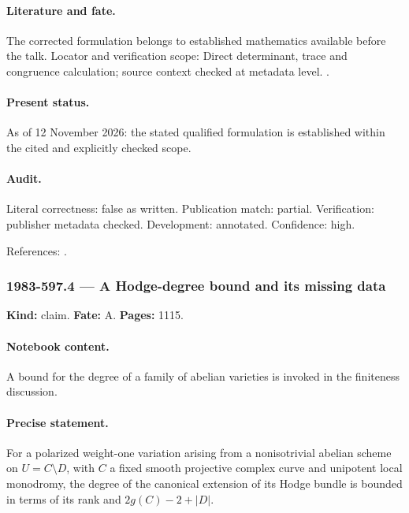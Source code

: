 \paragraph{Literature and fate.} The corrected formulation belongs to established mathematics available before the talk. Locator and verification scope: Direct determinant, trace and congruence calculation; source context checked at metadata level. \cite{schmid1973variation}.

\paragraph{Present status.} As of 12 November 2026: the stated qualified formulation is established within the cited and explicitly checked scope.

\paragraph{Audit.} Literal correctness: false as written. Publication match: partial. Verification: publisher metadata checked. Development: annotated. Confidence: high.

\noindent References: \citep{schmid1973variation}.\par

\subsubsection{1983-597.4 --- A Hodge-degree bound and its missing data}

\label{item:1983-597.4}

\noindent\textbf{Kind:} claim. \textbf{Fate:} A. \textbf{Pages:} 1115.\par

\paragraph{Notebook content.} A bound for the degree of a family of abelian varieties is invoked in the finiteness discussion.

\paragraph{Precise statement.} For a polarized weight-one variation arising from a nonisotrivial abelian scheme on \(U=C\setminus D\), with \(C\) a fixed smooth projective complex curve and unipotent local monodromy, the degree of the canonical extension of its Hodge bundle is bounded in terms of its rank and \(2g(C)-2+|D|\).

